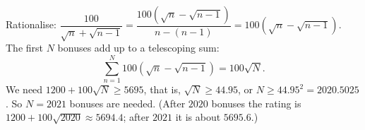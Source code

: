 Rationalise: $\dfrac{100}{\sqrt n+\sqrt{n-1}}=\dfrac{100(\sqrt n-\sqrt{n-1})}{n-(n-1)}=100(\sqrt n-\sqrt{n-1})$. The first $N$ bonuses add up to a telescoping sum:
\[\sum_{n=1}^{N}100(\sqrt n-\sqrt{n-1})=100\sqrt N .\]
We need $1200+100\sqrt N\ge5695$, that is, $\sqrt N\ge44.95$, or $N\ge44.95^2=2020.5025$. So $N=\boxed{2021}$ bonuses are needed. (After $2020$ bonuses the rating is $1200+100\sqrt{2020}\approx5694.4$; after $2021$ it is about $5695.6$.)
